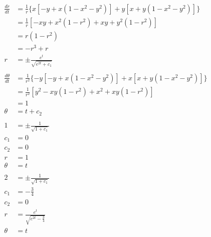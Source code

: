 \documentclass{article}
\begin{document}
\setcounter{subsubsection}{24}
\subsubsection{}

\begin{align*}
  \frac{d r}{d t}      & = \frac{1}{r} \{ x [-y + x (1 - x^2 - y^2)] + y [x + y (1 - x^2 - y^2)] \}    \\
                       & = \frac{1}{r} [-x y + x^2 (1 - r^2) + x y + y^2 (1 - r^2)]                    \\
                       & = r (1 - r^2)                                                                 \\
                       & = -r^3 + r                                                                    \\
  r                    & = \pm \frac{e^t}{\sqrt{e^{2 t} + c_1}}                                        \\ \\
  \frac{d \theta}{d t} & = \frac{1}{r^2} \{ -y [-y + x (1 - x^2 - y^2)] + x [x + y (1 - x^2 - y^2)] \} \\
                       & = \frac{1}{r^2} [y^2 - x y (1 - r^2) + x^2 + x y (1 - r^2)]                   \\
                       & = 1                                                                           \\
  \theta               & = t + c_2                                                                     \\ \\
  1                    & = \pm \frac{1}{\sqrt{1 + c_1}}                                                \\
  c_1                  & = 0                                                                           \\
  c_2                  & = 0                                                                           \\
  r                    & = 1                                                                           \\
  \theta               & = t                                                                           \\ \\
  2                    & = \pm \frac{1}{\sqrt{1 + c_1}}                                                \\
  c_1                  & = -\frac{3}{4}                                                                \\
  c_2                  & = 0                                                                           \\
  r                    & = \frac{e^t}{\sqrt{e^{2 t} - \frac{3}{4}}}                                    \\
  \theta               & = t
\end{align*}
\end{document}
